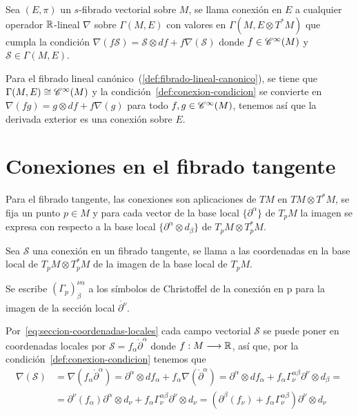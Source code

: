 \begin{definition}
  Sea $(E, \pi)$ un $s$-fibrado vectorial sobre $M$, se llama conexión en $E$ a cualquier operador $\mathbb{R}$-lineal
  $\nabla$ sobre $\Gamma(M, E)$ con valores en $\Gamma(M, E\otimes T^* M)$ que cumpla la condición $\nabla(f\mathcal{S})
  =\mathcal{S}\otimes df+f\nabla(\mathcal{S})$\label{def:conexion-condicion} donde $f\in\mathscr{C}^\infty(M)$ y
  $\mathcal{S}\in\Gamma(M, E)$.
\end{definition}

Para el fibrado lineal canónico~(\ref{def:fibrado-lineal-canonico}), se tiene que $\Gamma(M, E)
\cong\mathscr{C}^\infty(M)$ y la condición~\ref{def:conexion-condicion} se convierte en $\nabla(fg)=g\otimes df+f\nabla(g)$
para todo $f,g\in\mathscr{C}^\infty(M)$, tenemos así que la derivada exterior es una conexión sobre $E$.


\section{Conexiones en el fibrado tangente}

Para el fibrado tangente, las conexiones son aplicaciones de $TM$ en $TM\otimes T^*M$, se fija un punto $p\in
M$ y para cada vector de la base local $\{\partial^\alpha\}$ de $T_p M$ la imagen se expresa con respecto a la
base local $\{\partial^\alpha\otimes d_\beta\}$ de $T_pM\otimes T_p^*M$.

\begin{definition}
  Sea $\mathcal{S}$ una conexión en un fibrado tangente, se llama  a las coordenadas en la base local de $T_pM\otimes T_p^*M$ de la imagen
  de la base local de $T_pM$.
\end{definition}
\begin{notation}
  Se escribe $(\Gamma_p)_\beta^{\nu\alpha}$ a los símbolos de Christoffel de la conexión en p para la imagen de la
  sección local $\mathring{\partial^\nu}$.
\end{notation}

Por~\ref{eq:seccion-coordenadas-locales} cada campo vectorial $\mathcal{S}$ se
puede poner en coordenadas locales por $\mathcal{S}=f_\alpha\mathring{\partial}^\alpha$ donde $f:M\longrightarrow \mathbb{R}$, así
que, por la condición~\ref{def:conexion-condicion} tenemos que
\begin{equation*}
  \begin{split}
    \nabla(\mathcal{S}) &=\nabla(f_\alpha
    \mathring{\partial}^\alpha)=\partial^\alpha\otimes df_\alpha+f_\alpha\nabla(\mathring{\partial}^\alpha)=
    \partial^\alpha\otimes df_\alpha+f_\alpha\Gamma_\nu^{\alpha\beta}\partial^\nu\otimes d_\beta=\\
    & = \partial^\nu(f_\alpha)\partial^\alpha\otimes d_\nu+f_\alpha\Gamma_\nu^{\alpha\beta}
    \partial^\nu\otimes d_\nu=(\partial^\beta(f_\nu)+f_\alpha\Gamma_\nu^{\alpha\beta})
    \partial^\nu\otimes d_\nu
  \end{split}
\end{equation*}

